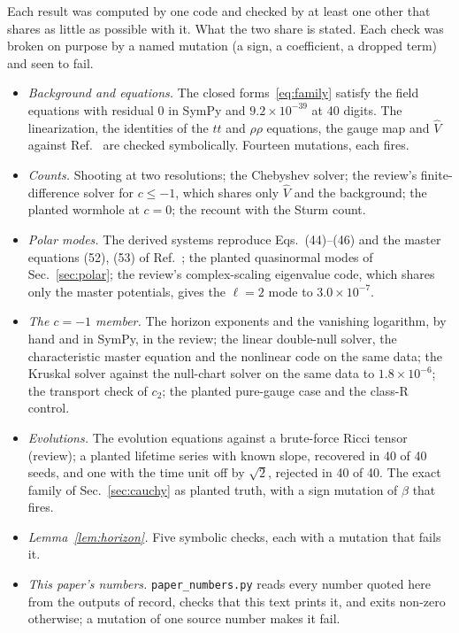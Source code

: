 \documentclass[11pt]{article}
\theoremstyle{plain}
\begin{document}
Each result was computed by one code and checked by at least one other that shares as little as possible with it. What the
two share is stated. Each check was broken on purpose by a named mutation (a sign, a coefficient, a dropped term) and seen to
fail.
\begin{itemize}
\item \emph{Background and equations.} The closed forms~\eqref{eq:family} satisfy the field equations with residual 0 in
  SymPy and $9.2\times10^{-39}$ at 40 digits. The linearization, the identities of the $tt$ and $\rho\rho$ equations, the gauge
  map and $\hat V$ against Ref.~\cite{BKZ12} are checked symbolically. Fourteen mutations, each fires.
\item \emph{Counts.} Shooting at two resolutions; the Chebyshev solver; the review's finite-difference solver for $c\le-1$,
  which shares only $\hat V$ and the background; the planted wormhole at $c=0$; the recount with the Sturm count.
\item \emph{Polar modes.} The derived systems reproduce Eqs.~(44)--(46) and the master equations (52), (53) of
  Ref.~\cite{ABCKY23}; the planted quasinormal modes of Sec.~\ref{sec:polar}; the review's complex-scaling eigenvalue code,
  which shares only the master potentials, gives the $\ell=2$ mode to $3.0\times10^{-7}$.
\item \emph{The $c=-1$ member.} The horizon exponents and the vanishing logarithm, by hand and in SymPy, in the review; the
  linear double-null solver, the characteristic master equation and the nonlinear code on the same data; the Kruskal solver
  against the null-chart solver on the same data to $1.8\times10^{-6}$; the transport check of $c_2$; the planted pure-gauge
  case and the class-R control.
\item \emph{Evolutions.} The evolution equations against a brute-force Ricci tensor (review); a planted lifetime series with
  known slope, recovered in 40 of 40 seeds, and one with the time unit off by $\sqrt2$, rejected in 40 of 40. The exact
  family of Sec.~\ref{sec:cauchy} as planted truth, with a sign mutation of $\beta$ that fires.
\item \emph{Lemma~\ref{lem:horizon}.} Five symbolic checks, each with a mutation that fails it.
\item \emph{This paper's numbers.} \texttt{paper\_numbers.py} reads every number quoted here from the outputs of record,
  checks that this text prints it, and exits non-zero otherwise; a mutation of one source number makes it fail.
\end{itemize}
\end{document}
